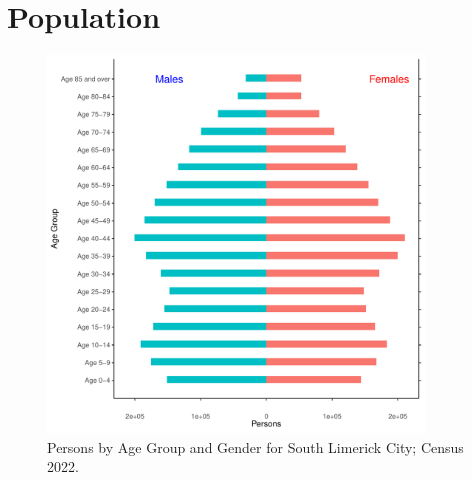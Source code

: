 \documentclass{article}
\begin{document}
\pagebreak

\section{Population} 
\label{sect:Pop}

\begin{figure}[h]
	\centering
	\includegraphics[width = 100mm]{../figures/PyramidPlot.pdf}
	\caption{Persons by Age Group and Gender for South Limerick City; Census 2022.}
	\label{fig:2ae19629-1a6a-13a3-e055-000000000001}
	\end{figure}
\end{document}

